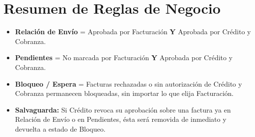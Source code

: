 \documentclass[11pt]{article}
\begin{document}
\begin{center}
\end{center}

\vspace{0.5cm}

\section*{Resumen de Reglas de Negocio}
\begin{itemize}
    \item \textbf{Relación de Envío} = Aprobada por Facturación \textbf{Y} Aprobada por Crédito y Cobranza.
    \item \textbf{Pendientes} = No marcada por Facturación \textbf{Y} Aprobada por Crédito y Cobranza.
    \item \textbf{Bloqueo / Espera} = Facturas rechazadas o sin autorización de Crédito y Cobranza permanecen bloqueadas, sin importar lo que elija Facturación.
    \item \textbf{Salvaguarda:} Si Crédito revoca su aprobación sobre una factura ya en Relación de Envío o en Pendientes, ésta será removida de inmediato y devuelta a estado de Bloqueo.
\end{itemize}
\end{document}
